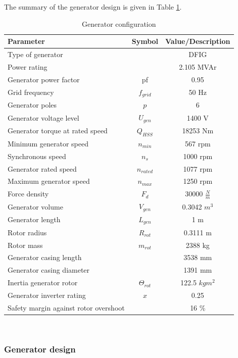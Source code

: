 The summary of the generator design is given in Table \ref{tab:generator_config}. 
\begin{table}[h]
\centering
\caption{Generator configuration}
\label{tab:generator_config}
\begin{tabular}{ |l|c|c|} 
\hline
\textbf{Parameter} & Symbol & \textbf{Value/Description}  \\ 
\hline
Type of generator & & DFIG\\
\hline
Power rating & & 2.105 MVAr\\
\hline
Generator power factor & pf & 0.95\\
\hline
Grid frequency & $f_{grid}$ & 50 Hz  \\
\hline
Generator poles & $p$ & 6\\
\hline
Generator voltage level & $U_{gen}$ & 1400 V\\
\hline
Generator torque at rated speed & $Q_{HSS}$ & 18253 Nm \\
\hline
Minimum generator speed & $n_{min}$ & 567 rpm\\
\hline
Synchronous speed & $n_s$ & 1000 rpm\\
\hline
Generator rated speed & $n_{rated}$ & 1077 rpm\\
\hline
Maximum generator speed & $n_{max}$ & 1250 rpm \\
\hline
Force density & $F_d$ & 30000 $\frac{N}{m}$\\
\hline
Generator volume & $V_{gen}$ & 0.3042 $m^3$\\
\hline
Generator length & $L_{gen}$ & 1 m\\
\hline
Rotor radius & $R_{rot}$ & 0.3111 m\\
\hline
Rotor mass & $m_{rot}$ & 2388 kg \\
\hline
Generator casing length& & 3538 mm\\
\hline
Generator casing diameter& & 1391 mm\\
\hline
Inertia generator rotor & $\Theta_{rot}$ & 122.5 $kg m^2$\\
\hline
Generator inverter rating & $x$ & 0.25\\
\hline
Safety margin against rotor overshoot & & 16 \%\\
\hline
\end{tabular} \\
\end{table}

\subsubsection{Generator design}

